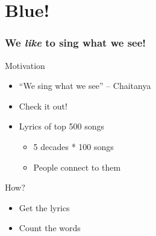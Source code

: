 \documentclass[presentation]{beamer}
\begin{document}
\section*{Blue!}
\label{sec-2}
\begin{frame}
\frametitle{We \emph{like} to sing what we see!}
\label{sec-2_1}
\begin{block}{Motivation}
\label{sec-2_1_1}

\begin{itemize}
\item ``We sing what we see'' -- Chaitanya
\item Check it out!
\item Lyrics of top 500 songs

\begin{itemize}
\item 5 decades * 100 songs
\item People connect to them
\end{itemize}

\end{itemize}
\end{block}
\begin{block}{How?}
\label{sec-2_1_2}
\begin{itemize}

\item Get the lyrics\\
\label{sec-2_1_2_1}%
\item Count the words\\
\label{sec-2_1_2_2}%
\end{itemize} %
\end{block}
\end{frame}
\end{document}
